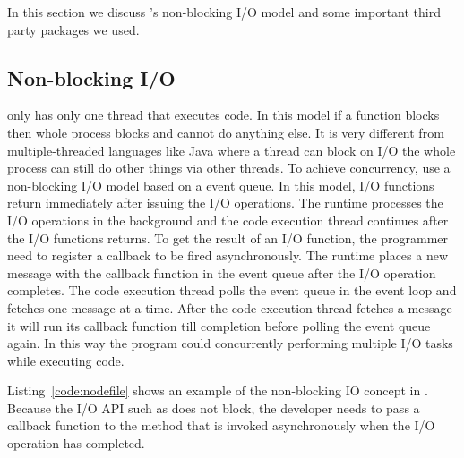 In this section we discuss \nodejs's non-blocking I/O model and some
important third party packages we used.

\subsection{Non-blocking I/O}

\js only has only one thread that executes \js code.
In this model if a function blocks then whole process blocks and cannot
do anything else.
It is very different from multiple-threaded languages like Java where
a thread can block on I/O the whole process can still do other things
via other threads.
To achieve concurrency, \js use a non-blocking I/O model based on a event queue.
In this model, I/O functions return immediately after issuing the I/O operations.
The runtime processes the I/O operations in the background and the code execution
thread continues after the I/O functions returns.
To get the result of an I/O function, the programmer need to register a callback
to be fired asynchronously.
The runtime places a new message with the callback function in the event queue after the I/O operation
completes.
The code execution thread polls the event queue in the event loop and fetches
one message at a time.
After the code execution thread fetches a message it will run its callback function
till completion before polling the event queue again.
In this way the program could concurrently performing multiple I/O tasks while executing
\js code.


Listing~\ref{code:nodefile} shows an example of the non-blocking IO concept in \nodejs. 
Because the I/O API such as  does not block, 
the developer needs to pass a callback function to the  method  
that is invoked asynchronously when the I/O operation has completed.

